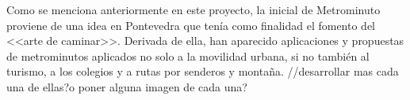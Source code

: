 
Como se menciona anteriormente en este proyecto, la inicial de Metrominuto proviene de una idea en Pontevedra que tenía como finalidad el fomento del <<arte de caminar>>.
Derivada de ella, han aparecido aplicaciones y propuestas de metrominutos aplicados no solo a la movilidad urbana, si no también al turismo, a los colegios y a rutas por senderos y montaña.
//desarrollar mas cada una de ellas?o poner alguna imagen de cada una?
